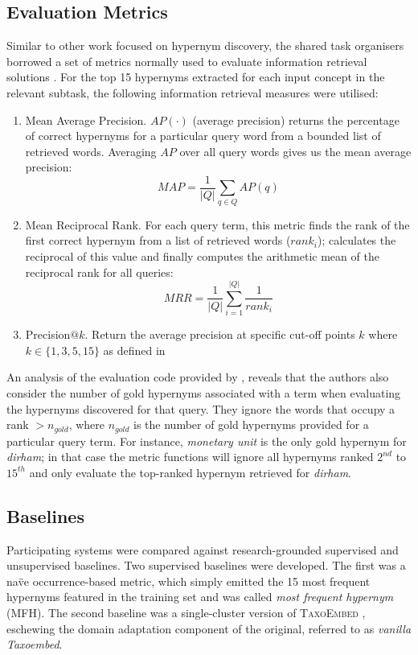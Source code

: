 \subsection{Evaluation Metrics}
Similar to other work \citep{espinosa2016supervised, ustalov2017negative} focused on hypernym discovery, the shared task organisers borrowed a set of metrics normally used to evaluate information retrieval solutions \citep{bian2008finding}.  For the top 15 hypernyms extracted for each input concept in the relevant subtask, the
following information retrieval measures were utilised:
\begin{enumerate}
    \item Mean Average Precision.  $AP(\cdot)$ (average precision) returns the percentage of correct hypernyms for a particular query word from a bounded list of retrieved words.  Averaging $AP$ over all query words gives us the mean average precision: 
    \[MAP = \frac{1}{\vert Q \vert} \sum_{q \in Q} AP(q)\]
    \item Mean Reciprocal Rank. For each query term, this metric finds the rank of the first correct hypernym from a list of retrieved words ($rank_i$); calculates the reciprocal of this value and finally computes the arithmetic mean of the reciprocal rank for all queries:
    \[MRR = \frac{1}{\vert Q \vert} \sum_{i=1}^{\vert Q \vert} \frac{1}{rank_i}\]
    \item Precision$@k$. Return the average precision at specific cut-off points $k$ where $k \in \{1, 3, 5, 15\}$ as defined in \citep{camacho2018semeval}
\end{enumerate}
An analysis of the evaluation code provided by \citeauthor{camacho2018semeval}, reveals that the authors also consider the number of gold hypernyms associated with a term when evaluating the hypernyms discovered for that query.  They ignore the words that occupy a rank $> n_{gold}$, where $n_{gold}$ is the number of gold hypernyms provided for a particular query term.  For instance, \textit{monetary unit} is the only gold hypernym for \textit{dirham}; in that case the metric functions will ignore all hypernyms ranked $2^{nd}$ to $15^{th}$ and only evaluate the top-ranked hypernym retrieved for \textit{dirham}.

\subsection{Baselines}
Participating systems were compared against research-grounded supervised and unsupervised baselines.  Two supervised baselines were developed.  The first was a na\"ve occurrence-based metric, which simply emitted the 15 most frequent hypernyms featured in the training set and was called \textit{most frequent hypernym} (MFH).  The second baseline was a single-cluster version of \textsc{TaxoEmbed} \citep{espinosa2016supervised}, eschewing the domain adaptation component of the original, referred to as \textit{vanilla Taxoembed}.

